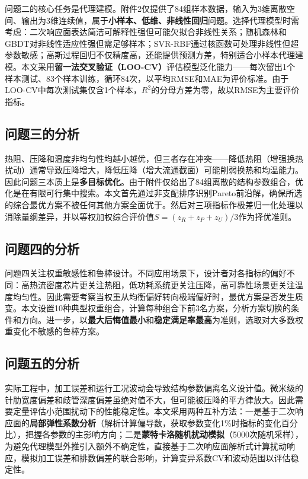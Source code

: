 \documentclass[12pt,a4paper]{ctexart}
\begin{document}
问题二的核心任务是代理建模。附件2仅提供了84组样本数据，输入为3维离散空间、输出为3维连续值，属于\textbf{小样本、低维、非线性回归}问题。选择代理模型时需考虑：二次响应面表达简洁可解释性强但可能欠拟合非线性关系；随机森林和GBDT对非线性适应性强但需足够样本；SVR-RBF通过核函数可处理非线性但超参数敏感；高斯过程回归不仅精度高，还能提供预测方差，特别适合小样本代理建模。本文采用\textbf{留一法交叉验证（LOO-CV）}评估模型泛化能力——每次留出1个样本测试、83个样本训练，循环84次，以平均RMSE和MAE为评价标准。由于LOO-CV中每次测试集仅含1个样本，$R^2$的分母方差为零，故以RMSE为主要评价指标。

\subsection{问题三的分析}

热阻、压降和温度非均匀性均越小越优，但三者存在冲突——降低热阻（增强换热扰动）通常导致压降增大，降低压降（增大流通截面）可能削弱换热和均温能力。因此问题三本质上是\textbf{多目标优化}。由于附件仅给出了84组离散的结构参数组合，优化是在有限可行集中搜索。本文首先通过非支配排序识别Pareto前沿解，确保所选的综合最优方案不被任何其他方案全面优于。然后对三项指标作极差归一化处理以消除量纲差异，并以等权加权综合评价值$S = (z_R+z_P+z_U)/3$作为择优准则。

\subsection{问题四的分析}

问题四关注权重敏感性和鲁棒设计。不同应用场景下，设计者对各指标的偏好不同：高热流密度芯片更关注热阻，低功耗系统更关注压降，高可靠性场景更关注温度均匀性。因此需要考察当权重从均衡偏好转向极端偏好时，最优方案是否发生质变。本文设置10种典型权重组合，计算每种组合下前3名方案，分析方案切换的条件和方向。进一步，以\textbf{最大后悔值最小}和\textbf{稳定满足率最高}为准则，选取对大多数权重变化不敏感的鲁棒方案。

\subsection{问题五的分析}

实际工程中，加工误差和运行工况波动会导致结构参数偏离名义设计值。微米级的针肋宽度偏差和歧管深度偏差虽绝对值不大，但可能被压降的平方律放大。因此需要定量评估小范围扰动下的性能稳定性。本文采用两种互补方法：一是基于二次响应面的\textbf{局部弹性系数分析}（解析计算偏导数，获取参数变化1\%时指标的变化百分比），把握各参数的主影响方向；二是\textbf{蒙特卡洛随机扰动模拟}（5000次随机采样），为避免代理模型外推引入额外不确定性，直接基于二次响应面解析式计算扰动响应，模拟加工误差和排数偏差的联合影响，计算变异系数CV和波动范围以评估稳定性。
\end{document}
